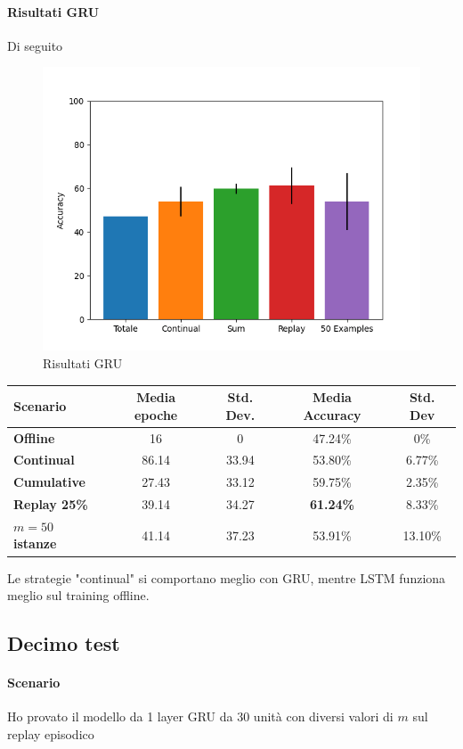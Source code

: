 \documentclass[11pt, a4paper, twoside, openright]{book}
\begin{document}
\paragraph{Risultati GRU} Di seguito\\
\begin{figure}[h]
    \centering
    \includegraphics[scale=0.75]{img/autotest_GRU.png}
    \caption{Risultati GRU}
    \label{fig:autotest_GRU1}
\end{figure}
\begin{tabular}{l|c|c|c|c}
    \textbf{Scenario} & \textbf{Media epoche} & \textbf{Std. Dev.} & \textbf{Media Accuracy} & \textbf{Std. Dev} \\
    \hline 
    \textbf{Offline} & 16 & 0 & 47.24\% & 0\% \\
    \textbf{Continual} & 86.14 & 33.94 & 53.80\% & 6.77\%\\
    \textbf{Cumulative} & 27.43 & 33.12 & 59.75\% & 2.35\%\\
    \textbf{Replay 25\%} & 39.14 & 34.27 & \textbf{61.24\%} & 8.33\%\\
    \textbf{$m = 50$ istanze} & 41.14 & 37.23 & 53.91\% & 13.10\%\\
\end{tabular}
Le strategie "continual" si comportano meglio con GRU, mentre LSTM funziona meglio sul training offline.

\subsection{Decimo test}
\paragraph{Scenario} Ho provato il modello da 1 layer GRU da 30 unità con diversi valori di $m$ sul replay episodico
\end{document}
